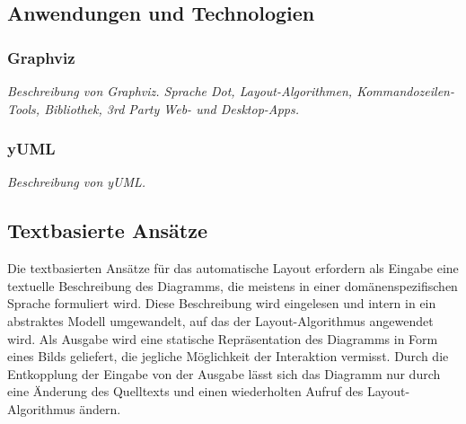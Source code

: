 \subsection{Anwendungen und Technologien}

\subsubsection{Graphviz}

\textit{Beschreibung von Graphviz. Sprache Dot, Layout-Algorithmen, Kommandozeilen-Tools, Bibliothek, 3rd Party Web- und Desktop-Apps.}


\subsubsection{yUML}

\textit{Beschreibung von yUML.}


\subsection{Textbasierte Ansätze}

Die textbasierten Ansätze für das automatische Layout erfordern als Eingabe eine textuelle Beschreibung des Diagramms, die meistens in einer domänenspezifischen Sprache formuliert wird. Diese Beschreibung wird eingelesen und intern in ein abstraktes Modell umgewandelt, auf das der Layout-Algorithmus angewendet wird. Als Ausgabe wird eine statische Repräsentation des Diagramms in Form eines Bilds geliefert, die jegliche Möglichkeit der Interaktion vermisst. Durch die Entkopplung der Eingabe von der Ausgabe lässt sich das Diagramm nur durch eine Änderung des Quelltexts und einen wiederholten Aufruf des Layout-Algorithmus ändern.



